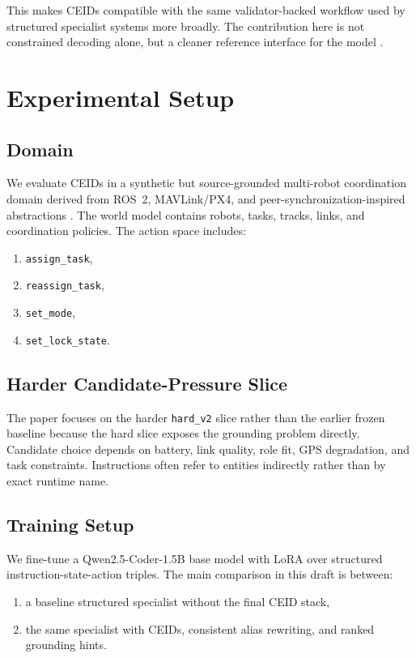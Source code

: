\documentclass[manuscript,screen,review]{jair}
\begin{document}
This makes CEIDs compatible with the same validator-backed workflow used by structured specialist systems more broadly. The contribution here is not constrained decoding alone, but a cleaner reference interface for the model \parencite{scholak2021picard,shin2021constrained,geng2023grammar,xia2025structured}.

\section{Experimental Setup}
\subsection{Domain}
We evaluate CEIDs in a synthetic but source-grounded multi-robot coordination domain derived from ROS~2, MAVLink/PX4, and peer-synchronization-inspired abstractions \parencite{ros2_repo,px4_site,iroh_docs,p2panda_site}. The world model contains robots, tasks, tracks, links, and coordination policies. The action space includes:
\begin{enumerate}[leftmargin=*,itemsep=0.25em]
  \item \texttt{assign\_task},
  \item \texttt{reassign\_task},
  \item \texttt{set\_mode},
  \item \texttt{set\_lock\_state}.
\end{enumerate}

\subsection{Harder Candidate-Pressure Slice}
The paper focuses on the harder \texttt{hard\_v2} slice rather than the earlier frozen baseline because the hard slice exposes the grounding problem directly. Candidate choice depends on battery, link quality, role fit, GPS degradation, and task constraints. Instructions often refer to entities indirectly rather than by exact runtime name.

\subsection{Training Setup}
We fine-tune a Qwen2.5-Coder-1.5B base model with LoRA over structured instruction-state-action triples. The main comparison in this draft is between:
\begin{enumerate}[leftmargin=*,itemsep=0.25em]
  \item a baseline structured specialist without the final CEID stack,
  \item the same specialist with CEIDs, consistent alias rewriting, and ranked grounding hints.
\end{enumerate}
\end{document}
